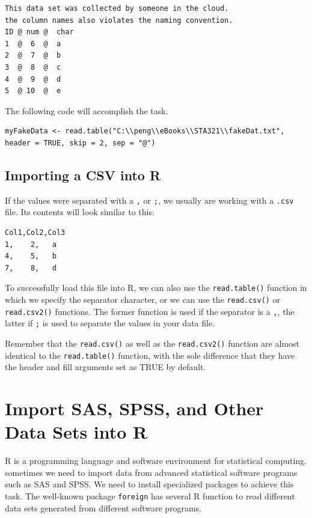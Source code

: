 \documentclass[
]{book}
\begin{document}
\begin{verbatim}
This data set was collected by someone in the cloud.
the column names also violates the naming convention.
ID @ num @  char
1  @  6  @  a
2  @  7  @  b
3  @  8  @  c
4  @  9  @  d
5  @ 10  @  e
\end{verbatim}

The following code will accomplish the task.

\begin{verbatim}
myFakeData <- read.table("C:\\peng\\eBooks\\STA321\\fakeDat.txt", header = TRUE, skip = 2, sep = "@")
\end{verbatim}

\hypertarget{importing-a-csv-into-r}{%
\subsection{Importing a CSV into R}\label{importing-a-csv-into-r}}

If the values were separated with a \texttt{,} or \texttt{;}, we usually are working with a \texttt{.csv} file. Its contents will look similar to this:

\begin{verbatim}
Col1,Col2,Col3
1,    2,   a
4,    5,   b
7,    8,   d
\end{verbatim}

To successfully load this file into R, we can also use the \texttt{read.table()} function in which we specify the separator character, or we can use the \texttt{read.csv()} or \texttt{read.csv2()} functions. The former function is used if the separator is a \texttt{,}, the latter if \texttt{;} is used to separate the values in your data file.

Remember that the \texttt{read.csv()} as well as the \texttt{read.csv2()} function are almost identical to the \texttt{read.table()} function, with the sole difference that they have the header and fill arguments set as TRUE by default.

\hypertarget{import-sas-spss-and-other-data-sets-into-r}{%
\section{Import SAS, SPSS, and Other Data Sets into R}\label{import-sas-spss-and-other-data-sets-into-r}}

R is a programming language and software environment for statistical computing. sometimes we need to import data from advanced statistical software programs such as SAS and SPSS. We need to install specialized packages to achieve this task. The well-known package \texttt{foreign} has several R function to read different data sets generated from different software programs.
\end{document}
